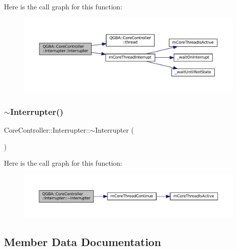Here is the call graph for this function\+:
\nopagebreak
\begin{figure}[H]
\begin{center}
\leavevmode
\includegraphics[width=350pt]{class_q_g_b_a_1_1_core_controller_1_1_interrupter_a8cd26448930b7b618dfb7badcb9568e3_cgraph}
\end{center}
\end{figure}
\mbox{\label{class_q_g_b_a_1_1_core_controller_1_1_interrupter_af5e8fc91095f7390621e98c1b5d91ea5}} 
\subsubsection{\texorpdfstring{$\sim$\+Interrupter()}{~Interrupter()}}
{\footnotesize\ttfamily Core\+Controller\+::\+Interrupter\+::$\sim$\+Interrupter (\begin{DoxyParamCaption}{ }\end{DoxyParamCaption})}

Here is the call graph for this function\+:
\nopagebreak
\begin{figure}[H]
\begin{center}
\leavevmode
\includegraphics[width=350pt]{class_q_g_b_a_1_1_core_controller_1_1_interrupter_af5e8fc91095f7390621e98c1b5d91ea5_cgraph}
\end{center}
\end{figure}


\subsection{Member Data Documentation}
\mbox{\label{class_q_g_b_a_1_1_core_controller_1_1_interrupter_a7b246c2cd1a4070ddc602523eb1d1e48}} 
